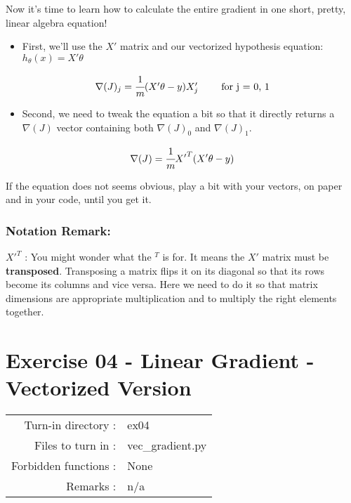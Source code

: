 \documentclass[]{article}
\providecommand{\tightlist}{%
  \setlength{\itemsep}{0pt}\setlength{\parskip}{0pt}}
\begin{document}
Now it's time to learn how to calculate the entire gradient in one
short, pretty, linear algebra equation!

\begin{itemize}
\tightlist
\item
  First, we'll use the \(X'\) matrix and our vectorized hypothesis
  equation: \(h_{\theta}(x)=X'\theta\)
\end{itemize}

\large

\[
\begin{matrix}
\nabla(J)_j = \cfrac{1}{m} (X'\theta - y)X'_{j} & & \text{ for j = 0, 1}
\end{matrix}
\] \normalsize

\begin{itemize}
\tightlist
\item
  Second, we need to tweak the equation a bit so that it directly
  returns a \(\nabla(J)\) vector containing both \(\nabla(J)_0\) and
  \(\nabla(J)_1\).
\end{itemize}

\large

\[
\nabla(J) = \cfrac{1}{m} {X'}^T(X'\theta - y)    
\] \normalsize

If the equation does not seems obvious, play a bit with your vectors, on
paper and in your code, until you get it.

\hypertarget{notation-remark}{%
\subsubsection{Notation Remark:}\label{notation-remark}}

\({X'}^T\) : You might wonder what the \(^T\) is for. It means the
\(X'\) matrix must be \textbf{transposed}. Transposing a matrix flips it
on its diagonal so that its rows become its columns and vice versa. Here
we need to do it so that matrix dimensions are appropriate
multiplication and to multiply the right elements together.

\clearpage

\hypertarget{exercise-04---linear-gradient---vectorized-version-1}{%
\section{Exercise 04 - Linear Gradient - Vectorized
Version}\label{exercise-04---linear-gradient---vectorized-version-1}}

\begin{longtable}[]{@{}rl@{}}
\toprule
\endhead
Turn-in directory : & ex04\tabularnewline
Files to turn in : & vec\_gradient.py\tabularnewline
Forbidden functions : & None\tabularnewline
Remarks : & n/a\tabularnewline
\bottomrule
\end{longtable}
\end{document}

